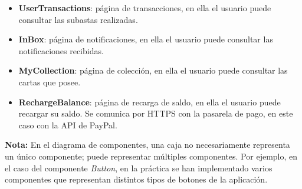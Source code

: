 \begin{itemize}
\begin{itemize}
\begin{itemize}
\begin{itemize}
                \item \textbf{UserTransactions}: página de transacciones, en ella el usuario puede consultar las subastas realizadas.
                \item \textbf{InBox}: página de notificaciones, en ella el usuario puede consultar las notificaciones recibidas.
                \item \textbf{MyCollection}: página de colección, en ella el usuario puede consultar las cartas que posee.
                \item \textbf{RechargeBalance}: página de recarga de saldo, en ella el usuario puede recargar su saldo. Se comunica por HTTPS con la pasarela de pago, en este caso con la API de PayPal.
            \end{itemize}
        \end{itemize}
    \end{itemize}
\end{itemize}

\bigskip
\textbf{Nota:} En el diagrama de componentes, una caja no necesariamente representa un único componente; puede representar múltiples componentes. 
Por ejemplo, en el caso del componente \textit{Button}, en la práctica se han implementado varios componentes que representan distintos tipos de botones de la aplicación.
